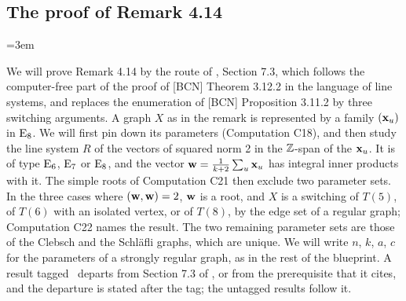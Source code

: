 \providecommand{\Ecal}{\mathcal E}
\providecommand{\cprof}{\opk{prof}_4}
\providecommand{\sd}{\mathbin{\triangle}}

\subsection{The proof of Remark 4.14}\label{sec:rem414}
\begingroup
\emergencystretch=3em

We will prove Remark 4.14 by the route of , Section 7.3, which
follows the computer-free part of the proof of [BCN] Theorem 3.12.2 in the language of line
systems, and replaces the enumeration of [BCN] Proposition 3.11.2 by three switching arguments.
A graph $X$ as in the remark is represented by a family $({\mathbf x}_u)$ in $\mathrm{E}_8$. We will first
pin down its parameters (Computation C18), and then study the line system $R$ of the vectors of
squared norm 2 in the ${\mathbb Z}$-span of the ${\mathbf x}_u$. It is of type $\mathrm{E}_6$, $\mathrm{E}_7$ or
$\mathrm{E}_8$, and the vector ${\mathbf w}=\frac1{k+2}\sum_u{\mathbf x}_u$ has integral inner products with it. The
simple roots of Computation C21 then exclude two parameter sets. In the three cases where
$({\mathbf w},{\mathbf w})=2$, ${\mathbf w}$ is a root, and $X$ is a switching of $T(5)$, of $T(6)$ with an isolated
vertex, or of $T(8)$, by the edge set of a regular graph; Computation C22 names the result. The
two remaining parameter sets are those of the Clebsch and the Schl\"afli graphs, which are
unique. We will write $n$, $k$, $a$, $c$ for the parameters of a strongly regular graph, as in
the rest of the blueprint. A result tagged \new\ departs from Section 7.3 of
, or from the prerequisite that it cites, and the departure is
stated after the tag; the untagged results follow it.

